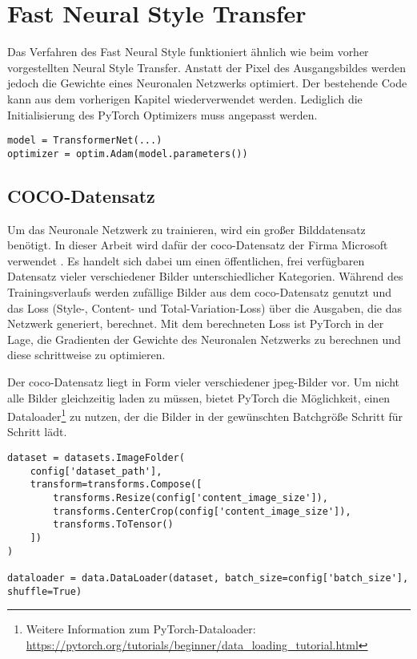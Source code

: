 \section{Fast Neural Style Transfer}

Das Verfahren des Fast Neural Style funktioniert ähnlich wie beim vorher vorgestellten Neural Style Transfer. Anstatt der Pixel des Ausgangsbildes werden jedoch die Gewichte eines Neuronalen Netzwerks optimiert. Der bestehende Code kann aus  dem vorherigen Kapitel wiederverwendet werden. Lediglich die Initialisierung des PyTorch Optimizers muss angepasst werden.

\begin{listing}[H]
\begin{verbatim}
model = TransformerNet(...)
optimizer = optim.Adam(model.parameters())
\end{verbatim}
\end{listing}

\subsection{COCO-Datensatz}

Um das Neuronale Netzwerk zu trainieren, wird ein großer Bilddatensatz benötigt. In dieser Arbeit wird dafür der \gls{coco}-Datensatz der Firma Microsoft verwendet \cite{DBLP:journals/corr/LinMBHPRDZ14}. Es handelt sich dabei um einen öffentlichen, frei verfügbaren Datensatz vieler verschiedener Bilder unterschiedlicher Kategorien. Während des Trainingsverlaufs werden zufällige Bilder aus dem \gls{coco}-Datensatz genutzt und das Loss  (Style-, Content- und Total-Variation-Loss) über die Ausgaben, die das Netzwerk generiert, berechnet. Mit dem berechneten Loss ist PyTorch in der Lage, die Gradienten der Gewichte des Neuronalen Netzwerks zu berechnen und diese schrittweise zu optimieren.

Der \gls{coco}-Datensatz liegt in Form vieler verschiedener \gls{jpeg}-Bilder vor. Um nicht alle Bilder gleichzeitig laden zu müssen, bietet PyTorch die Möglichkeit, einen Dataloader\footnote{Weitere Information zum PyTorch-Dataloader: \url{https://pytorch.org/tutorials/beginner/data_loading_tutorial.html}} zu nutzen, der die Bilder in der gewünschten Batchgröße Schritt für Schritt lädt.

\begin{listing}[H]
\begin{verbatim}
dataset = datasets.ImageFolder(
    config['dataset_path'],
    transform=transforms.Compose([
        transforms.Resize(config['content_image_size']),
        transforms.CenterCrop(config['content_image_size']),
        transforms.ToTensor()
    ])
)

dataloader = data.DataLoader(dataset, batch_size=config['batch_size'], shuffle=True)
\end{verbatim}
\end{listing}

